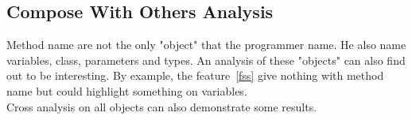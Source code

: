 \documentclass[12pt]{article}
\begin{document}
\subsection{Compose With Others Analysis}
Method name are not the only "object" that the programmer name. He also name variables, class, parameters and types. An analysis of these "objects" can also find out to be interesting. By example, the feature~\ref{fss} give nothing with method name but could highlight something on variables.\\
Cross analysis on all objects can also demonstrate some results.\\


\newpage



\end{document}
